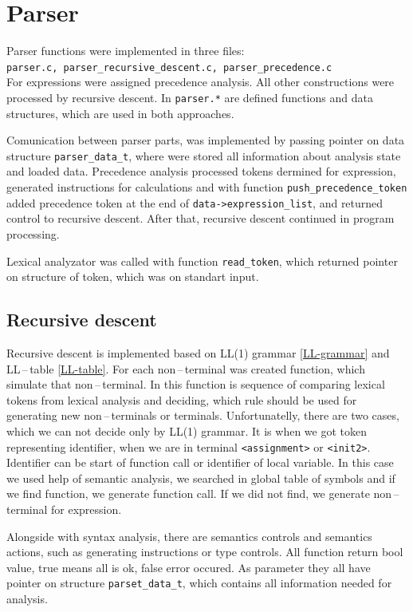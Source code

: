 \documentclass[11pt]{article}
\begin{document}
\newpage

\section{Parser}
Parser functions were implemented in three files:\\ \texttt{parser.c, parser\_recursive\_descent.c, parser\_precedence.c} \\
For expressions were assigned precedence analysis. All other constructions were processed by recursive descent.
In \texttt{parser.*} are defined functions and data structures, which are used in both approaches.

Comunication between parser parts, was implemented by passing pointer on data structure \texttt{parser\_data\_t}, 
where were stored all information about analysis state and loaded data. Precedence analysis processed tokens dermined for expression, generated instructions for calculations
and with function \texttt{push\_precedence\_token}  added precedence token at the end of \texttt{data->expression\_list}, and returned control to recursive descent.
After that, recursive descent continued in program processing.

Lexical analyzator was called with function \texttt{read\_token},
which returned pointer on structure of token, which was on standart input.

\subsection{Recursive descent}
Recursive descent is implemented based on LL(1) grammar \ref{LL-grammar} and LL\,--\,table \ref{LL-table}. For each non\,--\,terminal was created function,
which simulate that non\,--\,terminal. In this function is sequence of comparing lexical tokens from lexical analysis and deciding, which rule should be used for
generating new non\,--\,terminals or terminals. Unfortunatelly, there are two cases, which we can not decide only by LL(1) grammar. It is when we got token representing identifier, when we are 
in terminal \texttt{<assignment>} or \texttt{<init2>}. Identifier can be start of function call or identifier of local variable. In this case we used help of semantic analysis, we searched in global table 
of symbols and if we find function, we generate function call. If we did not find, we generate non\,--\,terminal for expression.

Alongside with syntax analysis, there are semantics controls and semantics actions, such as generating instructions or type controls. All function return bool value, true means
all is ok, false error occured. As parameter they all have pointer on structure \texttt{parset\_data\_t}, which contains all information needed for analysis. 
\end{document}
